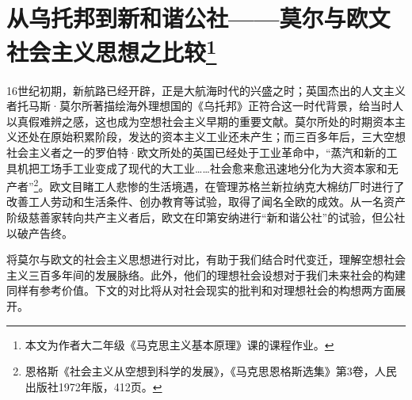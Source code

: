 \section*{从乌托邦到新和谐公社——莫尔与欧文社会主义思想之比较\footnote{本文为作者大二年级《马克思主义基本原理》课的课程作业。}}
\par 16世纪初期，新航路已经开辟，正是大航海时代的兴盛之时；英国杰出的人文主义者托马斯·莫尔所著描绘海外理想国的《乌托邦》正符合这一时代背景，给当时人以真假难辨之感，这也成为空想社会主义早期的重要文献。莫尔所处的时期资本主义还处在原始积累阶段，发达的资本主义工业还未产生；而三百多年后，三大空想社会主义者之一的罗伯特·欧文所处的英国已经处于工业革命中，“蒸汽和新的工具机把工场手工业变成了现代的大工业……社会愈来愈迅速地分化为大资本家和无产者”\footnote{恩格斯《社会主义从空想到科学的发展》，《马克思恩格斯选集》第3卷，人民出版社1972年版，412页。}。欧文目睹工人悲惨的生活境遇，在管理苏格兰新拉纳克大棉纺厂时进行了改善工人劳动和生活条件、创办教育等试验，取得了闻名全欧的成效。从一名资产阶级慈善家转向共产主义者后，欧文在印第安纳进行“新和谐公社”的试验，但公社以破产告终。
\par 将莫尔与欧文的社会主义思想进行对比，有助于我们结合时代变迁，理解空想社会主义三百多年间的发展脉络。此外，他们的理想社会设想对于我们未来社会的构建同样有参考价值。下文的对比将从对社会现实的批判和对理想社会的构想两方面展开。


